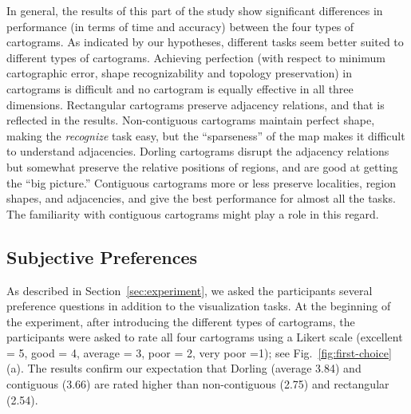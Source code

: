 \documentclass[10pt,journal,compsoc]{IEEEtran}
\begin{document}
In general, the results of this part of the study show significant differences in performance (in terms of time and accuracy) between the four types of cartograms. As indicated by our hypotheses, different tasks seem better suited to different types of cartograms.
 Achieving perfection (with respect to minimum cartographic error, shape recognizability and topology preservation) in cartograms is difficult and no cartogram is equally effective in all three dimensions. Rectangular cartograms preserve adjacency relations, and that is reflected in the results. Non-contiguous cartograms maintain perfect shape, making the \textit{recognize} task easy, but the ``sparseness'' of the map makes it difficult to understand adjacencies. Dorling cartograms disrupt the adjacency relations but somewhat preserve the relative positions of regions, and are good at getting the ``big picture.'' Contiguous cartograms more or less preserve localities, region shapes, and adjacencies, and give the best performance for almost all the tasks. The familiarity with contiguous cartograms might play a role in this regard. 





\subsection{Subjective  Preferences}

As described in Section~\ref{sec:experiment}, we asked the participants several preference questions in addition to the visualization tasks. At the beginning of the experiment, after introducing the different types of cartograms, the participants were asked to rate all four cartograms using a Likert scale (excellent = 5, good = 4, average = 3, poor = 2, very poor =1); see Fig.~\ref{fig:first-choice}(a). The results confirm our expectation that Dorling (average 3.84) and contiguous (3.66) are rated higher than non-contiguous (2.75) and rectangular (2.54).
\end{document}
